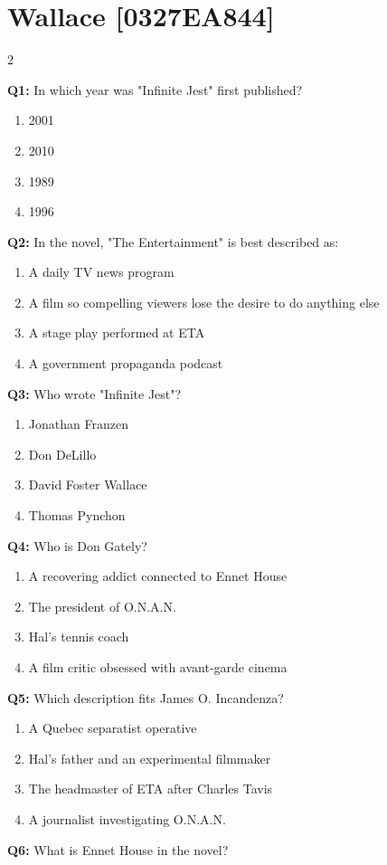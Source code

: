 \documentclass[10pt]{article}
\begin{document}
\section*{Wallace \footnotesize [0327EA844]}
\begin{multicols}{2}

\textbf{Q1:} In which year was "Infinite Jest" first published?

\begin{enumerate}[label=\arabic*.]
\item 2001
\item 2010
\item 1989
\item 1996
\end{enumerate}
\textbf{Q2:} In the novel, "The Entertainment" is best described as:

\begin{enumerate}[label=\arabic*.]
\item A daily TV news program
\item A film so compelling viewers lose the desire to do anything else
\item A stage play performed at ETA
\item A government propaganda podcast
\end{enumerate}
\textbf{Q3:} Who wrote "Infinite Jest"?

\begin{enumerate}[label=\arabic*.]
\item Jonathan Franzen
\item Don DeLillo
\item David Foster Wallace
\item Thomas Pynchon
\end{enumerate}
\textbf{Q4:} Who is Don Gately?

\begin{enumerate}[label=\arabic*.]
\item A recovering addict connected to Ennet House
\item The president of O.N.A.N.
\item Hal's tennis coach
\item A film critic obsessed with avant-garde cinema
\end{enumerate}
\textbf{Q5:} Which description fits James O. Incandenza?

\begin{enumerate}[label=\arabic*.]
\item A Quebec separatist operative
\item Hal's father and an experimental filmmaker
\item The headmaster of ETA after Charles Tavis
\item A journalist investigating O.N.A.N.
\end{enumerate}
\textbf{Q6:} What is Ennet House in the novel?


\end{multicols}
\end{document}
